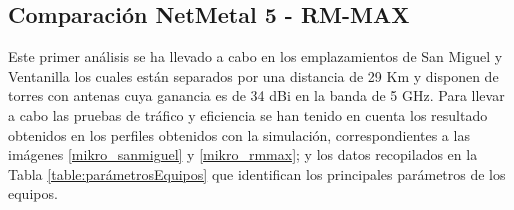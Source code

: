\subsection{Comparación NetMetal 5 - RM-MAX}
 Este primer análisis se ha llevado a cabo en los emplazamientos de San Miguel y Ventanilla los cuales están separados por una distancia de 29 Km y disponen de torres con antenas cuya ganancia es de 34 dBi en la banda de 5 GHz. Para llevar a cabo las pruebas de tráfico  y eficiencia se han tenido en cuenta los resultado obtenidos en los perfiles obtenidos con la simulación, correspondientes a las imágenes \ref{mikro_sanmiguel} y \ref{mikro_rmmax}; y los datos recopilados en la Tabla \ref{table:parámetrosEquipos} que identifican los principales parámetros de los equipos.\\
 
